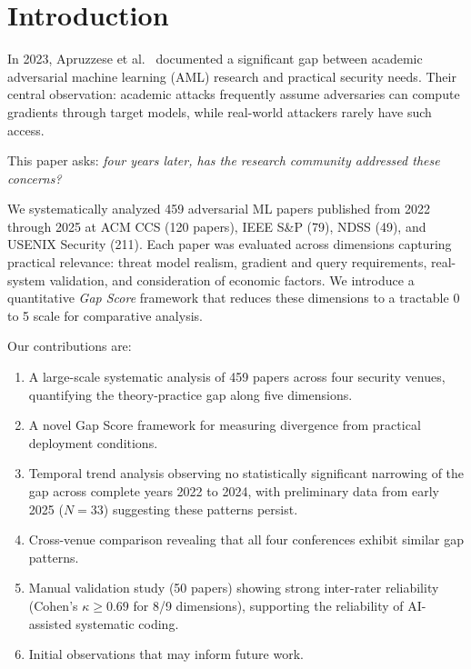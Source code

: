\documentclass[runningheads]{llncs}
\begin{document}
\section{Introduction}
\label{sec:intro}

In 2023, Apruzzese et al.~\cite{apruzzese2022real} documented a significant gap between academic adversarial machine learning (AML) research and practical security needs. Their central observation: academic attacks frequently assume adversaries can compute gradients through target models, while real-world attackers rarely have such access.

This paper asks: \emph{four years later, has the research community addressed these concerns?}

We systematically analyzed 459 adversarial ML papers published from 2022 through 2025 at ACM CCS (120 papers), IEEE S\&P (79), NDSS (49), and USENIX Security (211). Each paper was evaluated across dimensions capturing practical relevance: threat model realism, gradient and query requirements, real-system validation, and consideration of economic factors. We introduce a quantitative \emph{Gap Score} framework that reduces these dimensions to a tractable 0 to 5 scale for comparative analysis.

Our contributions are:
\begin{enumerate}
    \item A large-scale systematic analysis of 459 papers across four security venues, quantifying the theory-practice gap along five dimensions.
    \item A novel Gap Score framework for measuring divergence from practical deployment conditions.
    \item Temporal trend analysis observing no statistically significant narrowing of the gap across complete years 2022 to 2024, with preliminary data from early 2025 ($N = 33$) suggesting these patterns persist.
    \item Cross-venue comparison revealing that all four conferences exhibit similar gap patterns.
    \item Manual validation study (50 papers) showing strong inter-rater reliability (Cohen's $\kappa \geq 0.69$ for 8/9 dimensions), supporting the reliability of AI-assisted systematic coding.
    \item Initial observations that may inform future work.
\end{enumerate}
\end{document}

